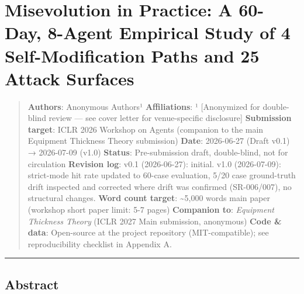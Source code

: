 \section{Misevolution in Practice: A 60-Day, 8-Agent Empirical Study of
4 Self-Modification Paths and 25 Attack
Surfaces}\label{misevolution-in-practice-a-60-day-8-agent-empirical-study-of-4-self-modification-paths-and-25-attack-surfaces}

\begin{quote}
\textbf{Authors}: Anonymous Authors¹ \textbf{Affiliations}: ¹
{[}Anonymized for double-blind review --- see cover letter for
venue-specific disclosure{]} \textbf{Submission target}: ICLR 2026
Workshop on Agents (companion to the main Equipment Thickness Theory
submission) \textbf{Date}: 2026-06-27 (Draft v0.1) → 2026-07-09 (v1.0)
\textbf{Status}: Pre-submission draft, double-blind, not for circulation
\textbf{Revision log}: v0.1 (2026-06-27): initial. v1.0 (2026-07-09):
strict-mode hit rate updated to 60-case evaluation, 5/20 case
ground-truth drift inspected and corrected where drift was confirmed
(SR-006/007), no structural changes. \textbf{Word count target}:
\textasciitilde5,000 words main paper (workshop short paper limit: 5-7
pages) \textbf{Companion to}: \emph{Equipment Thickness Theory} (ICLR
2027 Main submission, anony\-mous) \textbf{Code \& data}: Open-source at
the project repository (MIT-compatible); see reproducibility checklist
in Appendix A.
\end{quote}

\begin{center}\rule{0.5\linewidth}{0.5pt}\end{center}

\subsection{Abstract}\label{abstract}

